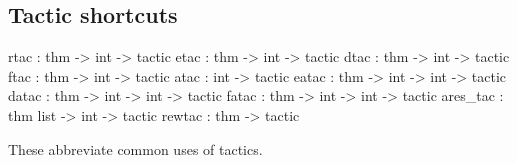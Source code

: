 \subsection{Tactic shortcuts}
\begin{ttbox} 
rtac     :      thm ->        int -> tactic
etac     :      thm ->        int -> tactic
dtac     :      thm ->        int -> tactic
ftac     :      thm ->        int -> tactic
atac     :                    int -> tactic
eatac    :      thm -> int -> int -> tactic
datac    :      thm -> int -> int -> tactic
fatac    :      thm -> int -> int -> tactic
ares_tac :      thm list   -> int -> tactic
rewtac   :      thm ->               tactic
\end{ttbox}
These abbreviate common uses of tactics.
